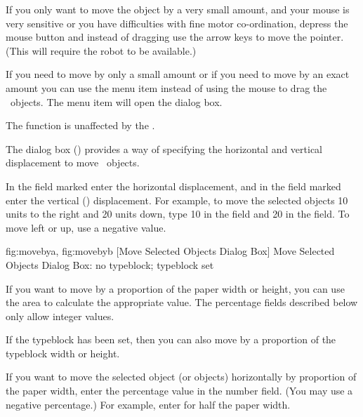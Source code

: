 If you only want to move the object by a very small amount, and your
mouse is very sensitive or you have difficulties with fine motor
co-ordination, depress the mouse button and instead of dragging use
the arrow keys to move the pointer. (This will require the
\gls{robot} to be available.)


If you need to move by only a small amount or if you need to
move by an exact amount you can use the  menu item
instead of using the mouse to drag the \selected\ objects.
The  menu item will open the  dialog box.

\begin{information}
The  function is unaffected by the \gridlock.
\end{information}

The  dialog box () provides a
way of specifying the horizontal and vertical displacement to move
\selected\ objects.

In the field marked  enter the horizontal
displacement, and in the field marked 
enter the vertical () displacement. For example, to move the
selected \glspl*{object} 10 units to the right and 20 units down,
type 10 in the  field and 20 in the
 field. To move left or up, use a negative
value.

{
  {fig:movebya}{}{},
  {fig:movebyb}{}{}
}
[Move Selected Objects Dialog Box]
{Move Selected Objects Dialog Box:
 no typeblock;
 typeblock set}


If you want to move by a proportion of the paper width or height,
you can use the  area to calculate the
appropriate value. The percentage fields described below only allow
integer values.

If the \gls{typeblock} has been set, then you can also move by a
proportion of the \gls{typeblock} width or height.


If you want to move the selected \gls{object} (or \glspl{object})
horizontally by proportion of the paper width, enter the percentage
value in the  number field. (You may
use a negative percentage.) For example, enter  for half
the paper width.

